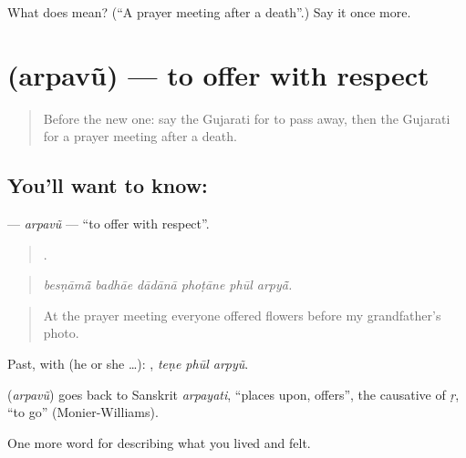 \begin{tcolorbox}[breakable,colback=teal!4,colframe=teal!35!black,title={Before you move on}]
What does  mean? (\textquotedblleft{}A prayer meeting after a death\textquotedblright{}.) Say it once more.
\end{tcolorbox}
\section[\texorpdfstring{\gu{અર્પવું} (arpavũ)}{અર્પવું (arpavũ)}]{ (arpavũ) — to offer with respect}

\label{lesson:GU-C499-arpavu}



\begin{quote}
Before the new one: say the Gujarati for to pass away, then the Gujarati for a prayer meeting after a death.
\end{quote}

\subsection*{You'll want to know: }
\textbf{} — \emph{arpavũ} — \textquotedblleft{}to offer with respect\textquotedblright{}.

\begin{quote}
     .
\end{quote}

\begin{quote}
\emph{besṇāmā̃ badhāe dādānā phoṭāne phūl arpyā̃.}
\end{quote}

\begin{quote}
At the prayer meeting everyone offered flowers before my grandfather's photo.
\end{quote}

Past, with  (he or she …):   , \emph{teṇe phūl arpyũ}.

\begin{cousinweb}
\textbf{} (\emph{arpavũ}) goes back to Sanskrit \emph{arpayati}, \textquotedblleft{}places upon, offers\textquotedblright{}, the causative of \emph{ṛ}, \textquotedblleft{}to go\textquotedblright{} (Monier-Williams).
\end{cousinweb}

\begin{grammarlens}[title={What you've built}]
One more word for describing what you lived and felt.
\end{grammarlens}

